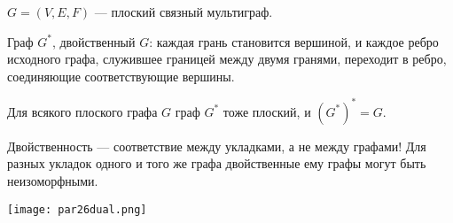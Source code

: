 \begin{defn}
    $G = (V, E, F)$ --- плоский связный мультиграф.

    Граф $G^*$, двойственный $G$: каждая грань становится вершиной, и каждое ребро исходного графа, служившее границей между двумя гранями, переходит в ребро, соединяющие соответствующие вершины.
\end{defn}

\begin{statement}
    Для всякого плоского графа $G$ граф $G^*$ тоже плоский, и $(G^*)^* = G$.
\end{statement}

\begin{notice}
    Двойственность --- соответствие между укладками, а не между графами! Для разных укладок одного и того же графа двойственные ему графы могут быть неизоморфными.
\end{notice}

\begin{center}
    \texttt{[image: par26dual.png]}
\end{center}